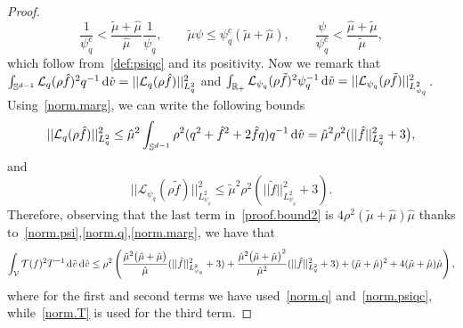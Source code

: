 \documentclass[a4paper]{article}
\theoremstyle{Theorem}\newtheorem{proposition}{Proposition}[section]
\theoremstyle{Remark}\newtheorem{remark}{Remark}[section]
\theoremstyle{Theorem}\newtheorem{theorem}{Theorem}[section]
\newcommand{\R}{\mathbb{R}}
\newcommand{\hv}{\hat{v}}
\newcommand{\tv}{\tilde{v}}
\newcommand{\hf}{\hat{f}}
\newcommand{\tf}{\tilde{f}}
\newcommand{\hmu}{\hat{\mu}}
\newcommand{\tmu}{\tilde{\mu}}
\newcommand{\intS}{\int_{\mathbb{S}^{d-1}}}
\newcommand{\intR}{\int_{\R_+}}
\newcommand{\intV}{\int_{\mathcal{V}}}
\begin{document}
\begin{proof}
 \[
\dfrac{1}{\psi_q^c} < \dfrac{\tmu+\hmu}{\hmu}\dfrac{1}{\psi_q}, \qquad \tmu \psi \le \psi_q^c (\tmu+\hmu), \qquad \dfrac{\psi}{\psi_q^c}<{\dfrac{\hmu+\tmu}{\tmu}},
 \]
 which follow from~\eqref{def:psiqc} and its positivity.
 Now we remark that $\intS \mathcal{L}_{q}(\rho\hf)^2q^{-1}\,{\rm d}\hv= ||\mathcal{L}_q(\rho\hf)||^2_{L^2_q}$ and $\intR \mathcal{L}_{\psi_q}(\rho\tf)^2\psi_q^{-1}\,{\rm d}\tv= ||\mathcal{L}_{\psi_q}(\rho\tf)||^2_{L^2_{\psi_q}}$. Using~\eqref{norm.marg}, we can write the following bounds
 \[
 || \mathcal{L}_q(\rho \hf)||^2_{L^2_q} \le \hmu^2\intS \rho^2(q^2 +\hf^2 +2 \hf q)q^{-1} \, {\rm d}\hv =\hmu^2\rho^2(|| \hf ||^2_{L^2_q} + 3\big),
 \]
 and
 \[
 ||\mathcal{L}_{\psi_q}(\rho\tf)||^2_{L^2_{\psi_q}} \le \tmu^2 \rho^2 \left(|| \tf ||^2_{L^2_{\psi_q}}+3\right).
 \]
Therefore, observing that the last term in~\eqref{proof.bound2} is $4\rho^2(\tmu+\hmu)\hmu$ thanks to~\eqref{norm.psi},\eqref{norm.q},\eqref{norm.marg}, we have that
 \begin{equation}\label{proof.bound3}
  \intV \mathcal{T}(f)^2 T^{-1} \, {\rm d} \tv \, {\rm d}\hv \le \rho^2 \left(   \dfrac{\tmu^2\big(\tmu+\hmu\big)}{\hmu} (||  \tf ||^2_{L^2_{\psi_q}}+3) +\dfrac{\hmu^2\big(\tmu+\hmu\big)^2}{\tmu^2} (|| \hf ||^2_{L^2_{q}}+3) +(\tmu+\hmu)^2+4(\tmu+\hmu)\hmu\right),
 \end{equation}
where for the first and second terms we have used~\eqref{norm.q} and~\eqref{norm.psiqc}, while~\eqref{norm.T} is used for the third term.


\end{proof}
\end{document}
